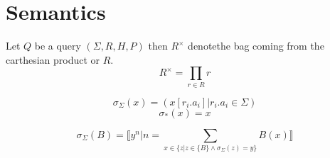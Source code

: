 \section{Semantics}

\begin{mydef}
	Let $Q$ be a query $(\Sigma,R,H,P)$ then $R^\times$ denotethe bag coming from the carthesian product or $R$.
	$$R^\times = \prod_{r \in R}{r}$$
\end{mydef}

\begin{mydef}
$$ \sigma_{\Sigma}(x) = (x[r_i.a_i] | r_i.a_i \in \Sigma) $$
$$ \sigma_{*}(x) = x $$
\end{mydef}

\begin{mydef}
	$$ \sigma_{\Sigma}(B) = \llbracket y^n | n = \sum_{x \in \{ z | z \in \{B\} \land \sigma_{\Sigma}(z) = y \} } B(x) \rrbracket $$
\end{mydef}

